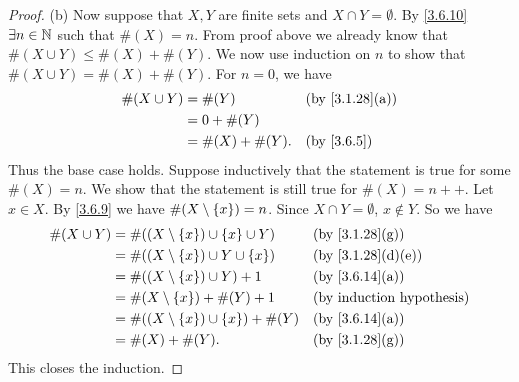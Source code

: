 \begin{proof}{(b)}
  Now suppose that \(X, Y\) are finite sets and \(X \cap Y = \emptyset\).
  By \cref{3.6.10} \(\exists n \in \mathbb{N}\) such that \(\#(X) = n\).
  From proof above we already know that \(\#(X \cup Y) \leq \#(X) + \#(Y)\).
  We now use induction on \(n\) to show that \(\#(X \cup Y) = \#(X) + \#(Y)\).
  For \(n = 0\), we have
  \begin{align*}
    \#(X \cup Y) & = \#(Y)          &  & \text{(by \cref{3.1.28}(a))} \\
                 & = 0 + \#(Y)                                        \\
                 & = \#(X) + \#(Y). &  & \by{3.6.5}
  \end{align*}
  Thus the base case holds.
  Suppose inductively that the statement is true for some \(\#(X) = n\).
  We show that the statement is still true for \(\#(X) = n++\).
  Let \(x \in X\).
  By \cref{3.6.9} we have \(\#(X \setminus \left\lbrace x\right\rbrace) = n\).
  Since \(X \cap Y = \emptyset\), \(x \notin Y\).
  So we have
  \begin{align*}
    \#(X \cup Y) & = \#((X \setminus \set{x}) \cup \set{x} \cup Y)  &  & \text{(by \cref{3.1.28}(g))}    \\
                 & = \#((X \setminus \set{x}) \cup Y \cup \set{x})  &  & \text{(by \cref{3.1.28}(d)(e))} \\
                 & = \#((X \setminus \set{x}) \cup Y) + 1           &  & \text{(by \cref{3.6.14}(a))}    \\
                 & = \#(X \setminus \set{x}) + \#(Y) + 1            &  & \byIH                           \\
                 & = \#((X \setminus \set{x}) \cup \set{x}) + \#(Y) &  & \text{(by \cref{3.6.14}(a))}    \\
                 & = \#(X) + \#(Y).                                 &  & \text{(by \cref{3.1.28}(g))}
  \end{align*}
  This closes the induction.
\end{proof}

